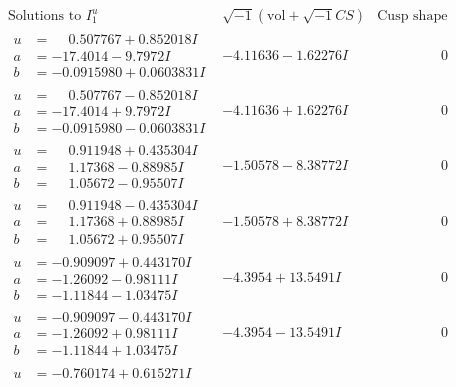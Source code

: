 \documentclass[1p]{elsarticle_modified}
\theoremstyle{definition}
\newcommand{\I}{\sqrt{-1}}
\begin{document}
$$\begin{array}{c|c|c}  
\text{Solutions to }I^u_{1}& \I (\text{vol} + \sqrt{-1}CS) & \text{Cusp shape}\\
 \hline 
\begin{aligned}
u &= \phantom{-}0.507767 + 0.852018 I \\
a &= -17.4014 - 9.7972 I \\
b &= -0.0915980 + 0.0603831 I\end{aligned}
 & -4.11636 - 1.62276 I & \phantom{-0.000000 } 0 \\ \hline\begin{aligned}
u &= \phantom{-}0.507767 - 0.852018 I \\
a &= -17.4014 + 9.7972 I \\
b &= -0.0915980 - 0.0603831 I\end{aligned}
 & -4.11636 + 1.62276 I & \phantom{-0.000000 } 0 \\ \hline\begin{aligned}
u &= \phantom{-}0.911948 + 0.435304 I \\
a &= \phantom{-}1.17368 - 0.88985 I \\
b &= \phantom{-}1.05672 - 0.95507 I\end{aligned}
 & -1.50578 - 8.38772 I & \phantom{-0.000000 } 0 \\ \hline\begin{aligned}
u &= \phantom{-}0.911948 - 0.435304 I \\
a &= \phantom{-}1.17368 + 0.88985 I \\
b &= \phantom{-}1.05672 + 0.95507 I\end{aligned}
 & -1.50578 + 8.38772 I & \phantom{-0.000000 } 0 \\ \hline\begin{aligned}
u &= -0.909097 + 0.443170 I \\
a &= -1.26092 - 0.98111 I \\
b &= -1.11844 - 1.03475 I\end{aligned}
 & -4.3954 + 13.5491 I & \phantom{-0.000000 } 0 \\ \hline\begin{aligned}
u &= -0.909097 - 0.443170 I \\
a &= -1.26092 + 0.98111 I \\
b &= -1.11844 + 1.03475 I\end{aligned}
 & -4.3954 - 13.5491 I & \phantom{-0.000000 } 0 \\ \hline\begin{aligned}
u &= -0.760174 + 0.615271 I \\

\end{aligned}
\end{array}$$
\end{document}
